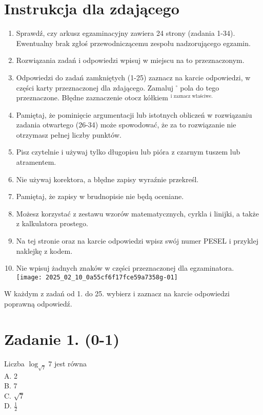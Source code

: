 \documentclass[10pt]{article}
\begin{document}
\section*{Instrukcja dla zdającego}
\begin{enumerate}
  \item Sprawdź, czy arkusz egzaminacyjny zawiera 24 strony (zadania 1-34). Ewentualny brak zgłoś przewodniczącemu zespołu nadzorującego egzamin.
  \item Rozwiązania zadań i odpowiedzi wpisuj w miejscu na to przeznaczonym.
  \item Odpowiedzi do zadań zamkniętych (1-25) zaznacz na karcie odpowiedzi, w części karty przeznaczonej dla zdającego. Zamaluj \({ }^{\square}\) pola do tego przeznaczone. Błędne zaznaczenie otocz kółkiem \({ }^{\text {i zaznacz właściwe. }}\)
  \item Pamiętaj, że pominięcie argumentacji lub istotnych obliczeń w rozwiązaniu zadania otwartego (26-34) może spowodować, że za to rozwiązanie nie otrzymasz pełnej liczby punktów.
  \item Pisz czytelnie i używaj tylko długopisu lub pióra z czarnym tuszem lub atramentem.
  \item Nie używaj korektora, a błędne zapisy wyraźnie przekreśl.
  \item Pamiętaj, że zapisy w brudnopisie nie będą oceniane.
  \item Możesz korzystać z zestawu wzorów matematycznych, cyrkla i linijki, a także z kalkulatora prostego.
  \item Na tej stronie oraz na karcie odpowiedzi wpisz swój numer PESEL i przyklej naklejkę z kodem.
  \item Nie wpisuj żadnych znaków w części przeznaczonej dla egzaminatora.\\
\texttt{[image: 2025\_02\_10\_0a55cf6f17fce59a7358g-01]}
\end{enumerate}

W każdym z zadań od 1. do 25. wybierz i zaznacz na karcie odpowiedzi poprawną odpowiedź.

\section*{Zadanie 1. (0-1)}
Liczba \(\log _{\sqrt{7}} 7\) jest równa\\
A. 2\\
B. 7\\
C. \(\sqrt{7}\)\\
D. \(\frac{1}{2}\)
\end{document}
